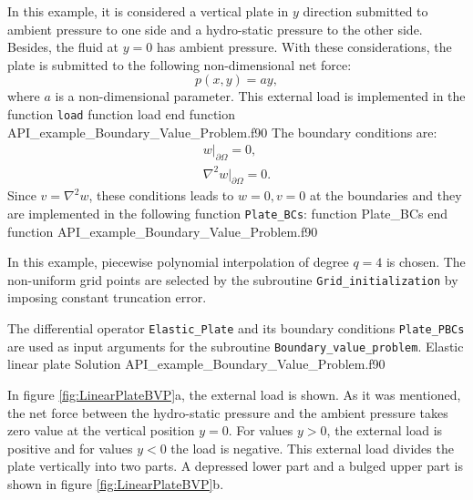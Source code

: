 In this example, it is considered a vertical plate in $y$ direction submitted to ambient pressure to one side and a hydro-static pressure to 
the other side. 
Besides, the fluid at $ y=0$ has ambient pressure. With these considerations, the plate is submitted to the following non-dimensional net 
force: 
            $$
                p(x,y) = a y,
            $$
where $ a $ is a non-dimensional parameter. This external load is implemented in the function \verb|load| 
            \vspace{0.5cm} 
                   {function load}
                   {end function}
                   {API_example_Boundary_Value_Problem.f90}
The boundary conditions  are: 
             \begin{align*}
                                w\big\rvert_{\partial \Omega}=0,  \\
                               \nabla^2 w \big\rvert_{\partial \Omega}=0. 
                   \end{align*}
Since $ v = \nabla^2  w $, these conditions leads to $ w=0, v=0 $ at the boundaries and they are implemented in the following function 
\verb|Plate_BCs|:     
              \vspace{0.5cm} 
            {function Plate_BCs}
            {end function}
            {API_example_Boundary_Value_Problem.f90}
            
In this example, piecewise polynomial interpolation of degree $ q = 4 $ is chosen. The non-uniform grid points are selected by the subroutine 
\verb|Grid_initialization| by imposing constant truncation error. 
            
The differential operator \verb|Elastic_Plate| and its boundary conditions \verb|Plate_PBCs| are used as input arguments for the subroutine 
\verb|Boundary_value_problem|. 
            \vspace{0.5cm} 
            {Elastic linear plate}
            {Solution}
            {API_example_Boundary_Value_Problem.f90}
            
In figure \ref{fig:LinearPlateBVP}a, the external load is shown. As it was mentioned, the net force between the hydro-static pressure and the 
ambient pressure takes zero value at the vertical position $ y=0$. For values $ y>0 $, the external load is positive and for values $ y<0$ 
the load is negative. This external load divides the plate vertically into two parts. A depressed lower part and a bulged upper part is shown 
in figure  \ref{fig:LinearPlateBVP}b.   
         
